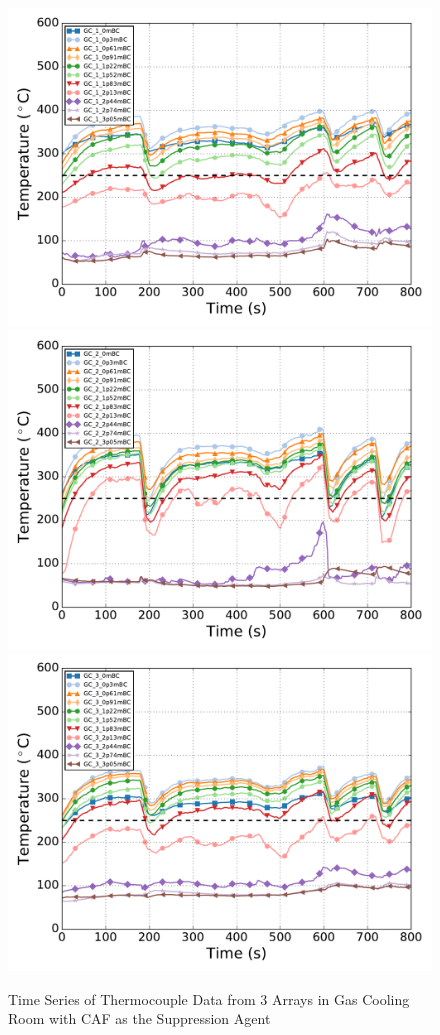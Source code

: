 \documentclass[12pt,oneside]{book}
\begin{document}
\begin{figure}[ht!]
	\includegraphics[width=.5\columnwidth]{../Figures/Gas_Cooling/GCSeries52_TC_A1}
	\includegraphics[width=.5\columnwidth]{../Figures/Gas_Cooling/GCSeries52_TC_A2}
	\includegraphics[width=.5\columnwidth]{../Figures/Gas_Cooling/GCSeries52_TC_A3}
	\caption{Time Series of Thermocouple Data from 3 Arrays in Gas Cooling Room with CAF as the Suppression Agent}
	\label{fig:gas_cooling_sub5}
\end{figure}

\clearpage
\end{document}
